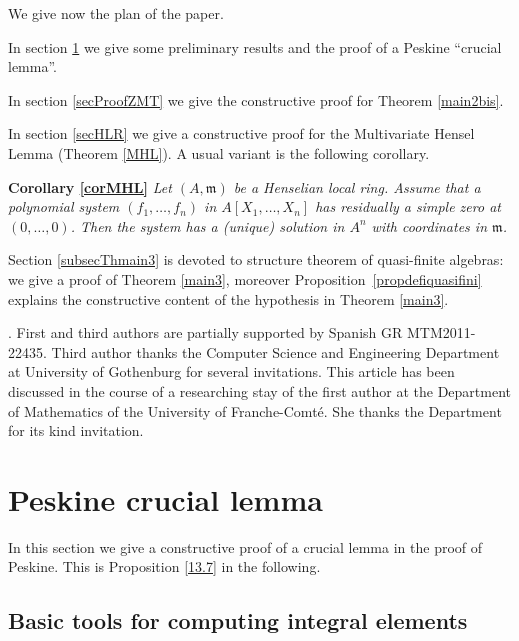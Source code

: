 \documentclass[11pt,a4paper,twoside]{article}
\newcommand{\gothic}{\mathfrak}
\newcommand{\fm}{{\gothic m}}
\begin{document}
\bigskip  We give now the plan of the paper.

\medskip In section \ref{secPeskLem} we give some preliminary results
and the proof of a Peskine ``crucial lemma''.

\medskip In section \ref{secProofZMT} we give the constructive proof for Theorem \ref{main2bis}.





\medskip In section \ref{secHLR} we give a constructive proof for the Multivariate Hensel Lemma (Theorem \ref{MHL}). A usual variant is 
the following  corollary. 

\medskip\noindent  
{\bf Corollary \ref{corMHL}} 
{\it Let  $(A,\fm)$ be a Henselian local ring. Assume that a polynomial
system
$
(f_1 , \dots , f_n)  
$ in $A[X_1,\dots,X_n]$
has residually a simple zero at $(0,\dots,0)$. Then the system has a (unique) solution in $A^{n}$ with coordinates in $\fm$.}

\medskip Section \ref{subsecThmain3} is devoted to structure theorem
of quasi-finite algebras: we give a proof of Theorem \ref{main3},
moreover Proposition~\ref{propdefiquasifini} explains the constructive content of the hypothesis in Theorem \ref{main3}.




\medskip {}. First and third authors  
are partially supported by Spanish GR MTM2011-22435. Third author thanks the
 Computer Science and Engineering Department at University of Gothenburg for several invitations. This article has been discussed in the course of a researching stay of the first author at the Department of Mathematics of the University of Franche-Comt\'e. 
She  thanks the Department for its  kind invitation.



\section{Peskine crucial lemma}
\label{secPeskLem}

In this section we give a constructive proof of a crucial lemma in the proof of Peskine. This is Proposition \ref{13.7} in the following.


\subsection{Basic tools for computing integral elements}
\end{document}
